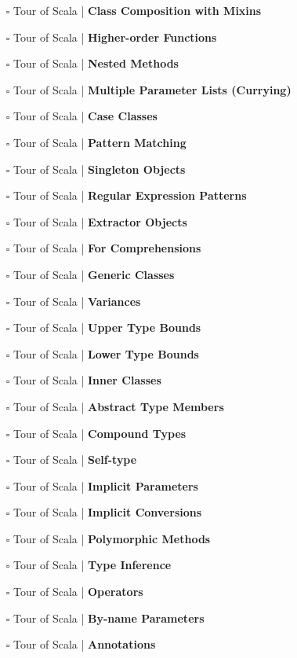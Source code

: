 \documentclass[a4, landscape, 12pt]{article}
\newcommand{\checkbox}{$\square$}%
\begin{document}
\begin{itemize}
{}
\item [\checkbox]  Tour of Scala  | \textbf{ Class Composition with Mixins
}
\item [\checkbox]  Tour of Scala  | \textbf{ Higher-order Functions
}
\item [\checkbox]  Tour of Scala  | \textbf{ Nested Methods
}
\item [\checkbox]  Tour of Scala  | \textbf{ Multiple Parameter Lists (Currying)
}
\item [\checkbox]  Tour of Scala  | \textbf{ Case Classes
}
\item [\checkbox]  Tour of Scala  | \textbf{ Pattern Matching
}
\item [\checkbox]  Tour of Scala  | \textbf{ Singleton Objects
}
\item [\checkbox]  Tour of Scala  | \textbf{ Regular Expression Patterns
}
\item [\checkbox]  Tour of Scala  | \textbf{ Extractor Objects
}
\item [\checkbox]  Tour of Scala  | \textbf{ For Comprehensions
}
\item [\checkbox]  Tour of Scala  | \textbf{ Generic Classes
}
\item [\checkbox]  Tour of Scala  | \textbf{ Variances
}
\item [\checkbox]  Tour of Scala  | \textbf{ Upper Type Bounds
}
\item [\checkbox]  Tour of Scala  | \textbf{ Lower Type Bounds
}
\item [\checkbox]  Tour of Scala  | \textbf{ Inner Classes
}
\item [\checkbox]  Tour of Scala  | \textbf{ Abstract Type Members
}
\item [\checkbox]  Tour of Scala  | \textbf{ Compound Types
}
\item [\checkbox]  Tour of Scala  | \textbf{ Self-type
}
\item [\checkbox]  Tour of Scala  | \textbf{ Implicit Parameters
}
\item [\checkbox]  Tour of Scala  | \textbf{ Implicit Conversions
}
\item [\checkbox]  Tour of Scala  | \textbf{ Polymorphic Methods
}
\item [\checkbox]  Tour of Scala  | \textbf{ Type Inference
}
\item [\checkbox]  Tour of Scala  | \textbf{ Operators
}
\item [\checkbox]  Tour of Scala  | \textbf{ By-name Parameters
}
\item [\checkbox]  Tour of Scala  | \textbf{ Annotations
}
\end{itemize}
\end{document}
